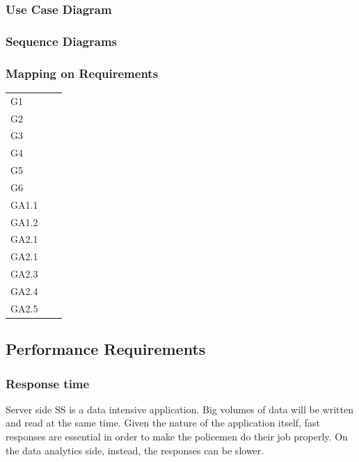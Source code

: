 	\subsubsection{Use Case Diagram}
	
	\subsubsection{Sequence Diagrams}
	
	\subsubsection{Mapping on Requirements}
	
	\begin{table}[]
	\begin{tabular}{|l|l|l|}
	\hline
 	\multirow{2}{*}{G1}		&  &  \\\cline{2-3}
 	& &\\ \hline
 	G2		&  &  \\ \hline
 	G3		&  &  \\ \hline
 	G4		&  &  \\ \hline
 	G5		&  &  \\ \hline
 	G6		&  &  \\ \hline
	GA1.1	&  &  \\ \hline
 	GA1.2	&  &  \\ \hline
 	GA2.1	&  &  \\ \hline
 	GA2.1	&  &  \\ \hline
 	GA2.3	&  &  \\ \hline
 	GA2.4	&  &  \\ \hline
 	GA2.5	&  &  \\ \hline
	\end{tabular}
	\end{table}
	
\subsection{Performance Requirements}

	\subsubsection{Response time}
	
Server side SS is a data intensive application. Big volumes of data  will be written and read at the same time. Given the nature of the application itself, fast responses are essential in order to make the policemen do their job properly. On the data analytics side, instead, the responses can be slower.\\

